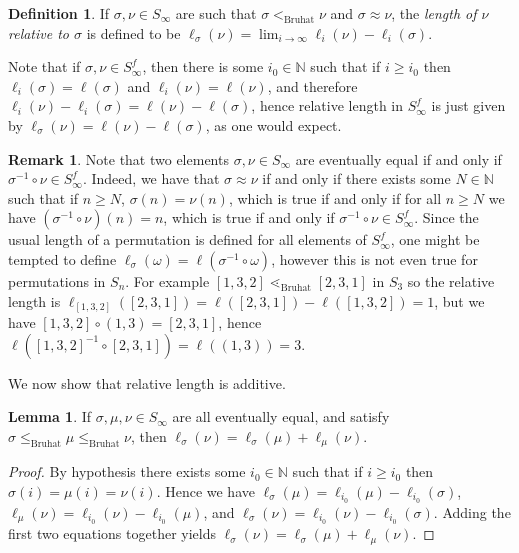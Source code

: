 \documentclass[oneside,11pt,reqno]{amsart}
\newcommand{\nn}{\ensuremath{\mathbb{N}}}
\theoremstyle{definition}
\newtheorem{definition}{Definition}
\newtheorem{remark}{Remark}
\newtheorem{proof techniques}{Proof Techniques}
\newtheorem{lemma}{Lemma}
\begin{document}
\begin{definition}
    If $\sigma , \nu \in S_\infty$ are such that $\sigma <_\text{Bruhat} \nu$ and $\sigma \approx \nu$, the \emph{length of $\nu$ relative to $\sigma$} is defined to be $\ell_\sigma(\nu) = \lim_{ i \to \infty} \ell_i(\nu) - \ell_i(\sigma)$. 
\end{definition}

Note that if $\sigma, \nu \in S_\infty^f$, then there is some $i_0 \in \nn$ such that if $i \geq i_0$ then $\ell_i(\sigma) = \ell(\sigma)$ and $\ell_i(\nu) = \ell(\nu)$, and therefore $\ell_i(\nu) - \ell_i(\sigma) = \ell(\nu) - \ell(\sigma)$, hence relative length in $S_\infty^f$ is just given by $\ell_\sigma(\nu) = \ell(\nu) - \ell(\sigma)$, as one would expect. 

\begin{remark}
Note that two elements $\sigma, \nu \in S_\infty$ are eventually equal if and only if $\sigma^{-1} \circ \nu \in S^f_\infty$. Indeed, we have that $\sigma \approx \nu$ if and only if there exists some $N \in \nn$ such that if $n \geq N$, $\sigma(n) = \nu(n)$, which is true if and only if for all $n \geq N$ we have $(\sigma^{-1} \circ \nu)(n) = n$, which is true if and only if $\sigma^{-1} \circ \nu \in S_\infty^f$. 
Since the usual length of a permutation is defined for all elements of $S_\infty^f$, one might be tempted to define $\ell_\sigma(\omega) = \ell(\sigma^{-1} \circ \omega)$, however this is not even true for permutations in $S_n$. For example $[1,3,2] \lessdot_\text{Bruhat} [2,3,1]$ in $S_3$ so the relative length is $\ell_{[1,3,2]}([2,3,1]) = \ell([2,3,1]) - \ell([1,3,2]) = 1$, but we have $[1,3,2] \circ (1,3) = [2 , 3 , 1]$, hence $\ell([1,3,2]^{-1} \circ [2,3,1]) = \ell( (1 , 3) ) = 3$.  
\end{remark}

We now show that relative length is additive. 


\begin{lemma}\label{lem: relative length is additive}
    If $\sigma , \mu , \nu \in S_\infty$ are all eventually equal, and satisfy $\sigma \leq_\text{Bruhat} \mu \leq_\text{Bruhat} \nu$, then $\ell_\sigma(\nu) = \ell_\sigma(\mu) + \ell_\mu(\nu)$.
\end{lemma}

\begin{proof}
    By hypothesis there exists some $i_0 \in \nn$ such that if $i \geq i_0$ then $\sigma(i) = \mu(i) = \nu(i)$. Hence we have $\ell_\sigma(\mu) = \ell_{i_0}(\mu) - \ell_{i_0}(\sigma)$, $\ell_\mu(\nu) = \ell_{i_0}(\nu) - \ell_{i_0}(\mu)$, and $\ell_\sigma(\nu) = \ell_{i_0}(\nu) - \ell_{i_0}(\sigma)$. Adding the first two equations together yields $\ell_\sigma(\nu) = \ell_\sigma(\mu) + \ell_\mu(\nu)$. 
\end{proof}
\end{document}
